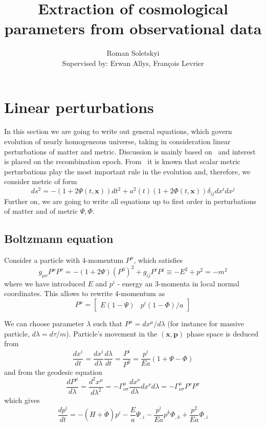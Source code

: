 \documentclass[12pt]{extarticle}
\title{Extraction of cosmological parameters from observational data}
\author{Roman Soletskyi\\
		Supervised by: Erwan Allys, François Levrier}
\numberwithin{problem}{section}
\numberwithin{theorem}{section}
\begin{document}
	\vspace{-3cm}
	\maketitle
	\section{Linear perturbations}
	In this section we are going to write out general equations, which govern evolution of nearly homogeneous universe, taking in consideration linear perturbations of matter and metric. Discussion is mainly based on~\cite{dodelson:2003} and interest is placed on the recombination epoch. From~\cite{gorbunov-rubakov-2:2011} it is known that scalar metric perturbations play the most important rule in the evolution and, therefore, we consider metric of form
	\begin{equation}
		\label{eq:perturb:metric}
		ds^2 = -(1 + 2\Psi(t, \mathbf{x}))dt^2 + a^2(t)(1 + 2\Phi(t, \mathbf{x}))\delta_{ij}dx^idx^j	
	\end{equation}
	Further on, we are going to write all equations up to first order in perturbations of matter and of metric $\Psi, \Phi$.
	
	\subsection{Boltzmann equation}
	Consider a particle with 4-momentum $P^\mu$, which satisfies 
	\begin{equation}
		g_{\mu\nu} P^\mu P^\nu = -(1 + 2\Psi)(P^0)^2 + g_{ij}P^iP^j \equiv -E^2 + p^2 = -m^2
	\end{equation}
	where we have introduced $E$ and $p^i$ - energy an 3-momenta in local normal coordinates. This allows to rewrite 4-momentum as 
	\begin{equation}
		\label{eq:4-momentum}
		P^\mu = \begin{bmatrix}
			E(1 - \Psi) & p^i(1 - \Phi) / a
		\end{bmatrix}
	\end{equation}
	
	We can choose parameter $\lambda$ such that $P^\mu = dx^\mu/d\lambda$ (for instance for massive particle, $d\lambda = d\tau/m$). Particle's movement in the $(\mathbf{x},\mathbf{p})$ phase space is deduced from
	\begin{equation}
		\label{eq:boltzmann:position}
		\frac{dx^i}{dt} = \frac{dx^i}{d\lambda}\frac{d\lambda}{dt} = \frac{P^i}{P^0} = \frac{p^i}{Ea}(1+\Psi-\Phi)
	\end{equation}
	and from the geodesic equation
	\begin{equation}
		\label{eq:boltzmann:momentum}
		\frac{dP^\mu}{d\lambda} = \frac{d^2x^\mu}{d\lambda^2} = -\Gamma^\mu_{\nu\sigma}\frac{dx^\nu}{d\lambda}{dx^\nu}{d\lambda} = -\Gamma^\mu_{\nu\sigma}P^\nu P^\sigma
	\end{equation}
	which gives
	\begin{equation}
		\frac{dp^i}{dt} = -(H + \dot{\Phi})p^i - \frac{E}{a}\Psi_{,i} - \frac{p^i}{Ea}p^k\Phi_{,k} + \frac{p^2}{Ea}\Phi_{,i}
	\end{equation}
\end{document}
